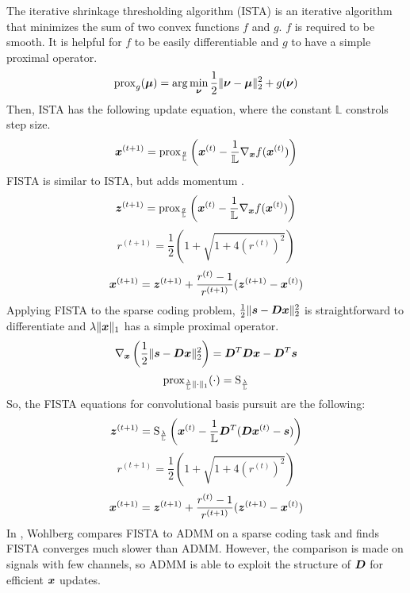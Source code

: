 The iterative shrinkage thresholding algorithm (ISTA) is an iterative algorithm that minimizes the sum of two convex functions $f$ and $g$. $f$ is required to be smooth. It is helpful for $f$ to be easily differentiable and $g$ to have a simple proximal operator.
%
\begin{equation}
\operatorname{prox}_g(\bm{\mu}) = \arg \min_{\bm{\nu}} \frac{1}{2}\|\bm{\nu} - \bm{\mu}\|_2^2 + g(\bm{\nu})
\end{equation}
%
Then, ISTA has the following update equation, where the constant $\mathbb{L}$ constrols step size.
%
\begin{equation}
\bm{x}^{(t + 1)} = \operatorname{prox}_{\frac{g}{\mathbb{L}}}\left(\bm{x}^{(t)} - \frac{1}{\mathbb{L}}\nabla_{\bm{x}} f(\bm{x}^{(t)})\right)
\end{equation}
%
FISTA is similar to ISTA, but adds momentum \cite{beck2009fast}.
\begin{equation}
\bm{z}^{(t + 1)} = \operatorname{prox}_{\frac{g}{\mathbb{L}}}\left(\bm{x}^{(t)} - \frac{1}{\mathbb{L}}\nabla_{\bm{x}}f(\bm{x}^{(t)})\right)
\end{equation}
\begin{equation}
r^{(t + 1)} = \frac{1}{2}\left(1 + \sqrt{1 + 4(r^{(t)})^2}\right)
\end{equation}
\begin{equation}
\bm{x}^{(t + 1)} = \bm{z}^{(t + 1)} + \frac{r^{(t)} - 1}{r^{(t + 1)}}(\bm{z}^{(t + 1)} - \bm{x}^{(t)})
\end{equation}
%
Applying FISTA to the sparse coding problem, $\frac{1}{2}\|\bm{s} - \bm{D}\bm{x}\|_2^2$ is straightforward to differentiate and $\lambda\|\bm{x}\|_1$ has a simple proximal operator.
%
\begin{equation}
\nabla_{\bm{x}}\left(\frac{1}{2}\|\bm{s} - \bm{D}\bm{x}\|_2^2\right) = \bm{D}^T\bm{D}\bm{x} - \bm{D}^T\bm{s}
\end{equation}
%
\begin{equation}
\operatorname{prox}_{\frac{\lambda}{\mathbb{L}}\|\cdot\|_1}(\cdot) = \operatorname{S}_{\frac{\lambda}{\mathbb{L}}}
\end{equation}
%
So, the FISTA equations for convolutional basis pursuit are the following:
\begin{equation}
\bm{z}^{(t + 1)} = \operatorname{S}_{\frac{\lambda}{\mathbb{L}}}\left(\bm{x}^{(t)} - \frac{1}{\mathbb{L}}\bm{D}^T(\bm{D}\bm{x}^{(t)} - \bm{s})\right)
\end{equation}
\begin{equation}
r^{(t + 1)} = \frac{1}{2}\left(1 + \sqrt{1 + 4(r^{(t)})^2}\right)
\end{equation}
\begin{equation}
\bm{x}^{(t + 1)} = \bm{z}^{(t + 1)} + \frac{r^{(t)} - 1}{r^{(t + 1)}}(\bm{z}^{(t + 1)} - \bm{x}^{(t)})
\end{equation}
%
In \cite{wohlberg2015efficient}, Wohlberg compares FISTA to ADMM on a sparse coding task and finds FISTA converges much slower than ADMM. However, the comparison is made on signals with few channels, so ADMM is able to exploit the structure of $\bm{D}$ for efficient $\bm{x}$ updates.

